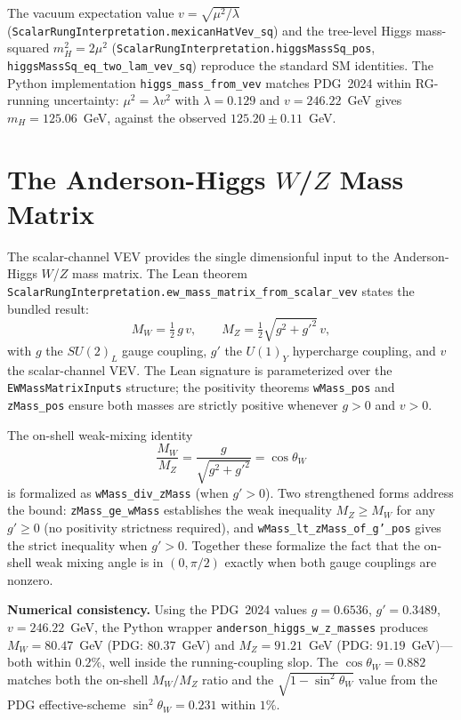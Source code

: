 \documentclass[aps,prd,twocolumn,showpacs,superscriptaddress,nofootinbib]{revtex4-2}
\begin{document}
The vacuum expectation value $v = \sqrt{\mu^2/\lambda}$
(\texttt{ScalarRungInterpretation.mexicanHatVev\_sq}) and the tree-level
Higgs mass-squared $m_H^2 = 2\mu^2$
(\texttt{ScalarRungInterpretation.higgsMassSq\_pos},
\texttt{higgsMassSq\_eq\_two\_lam\_vev\_sq}) reproduce the standard SM
identities. The Python implementation \texttt{higgs\_mass\_from\_vev}
matches PDG~2024 within RG-running uncertainty:
$\mu^2 = \lambda v^2$ with $\lambda = 0.129$ and $v = 246.22$~GeV gives
$m_H = 125.06$~GeV, against the observed $125.20 \pm 0.11$~GeV.

\section{The Anderson-Higgs $W$/$Z$ Mass Matrix}
\label{sec:ew-mass-matrix}

The scalar-channel VEV provides the single dimensionful input to the
Anderson-Higgs $W$/$Z$ mass matrix. The Lean theorem
\texttt{ScalarRungInterpretation.ew\_mass\_matrix\_from\_scalar\_vev}
states the bundled result:
\begin{equation}
M_W = \tfrac{1}{2}\,g\,v, \qquad
M_Z = \tfrac{1}{2}\sqrt{g^2 + g'^2}\,v,
\end{equation}
with $g$ the $SU(2)_L$ gauge coupling, $g'$ the $U(1)_Y$ hypercharge
coupling, and $v$ the scalar-channel VEV. The Lean signature is
parameterized over the \texttt{EWMassMatrixInputs} structure; the
positivity theorems \texttt{wMass\_pos} and \texttt{zMass\_pos} ensure
both masses are strictly positive whenever $g > 0$ and $v > 0$.

The on-shell weak-mixing identity
\begin{equation}
\label{eq:cos-theta-w}
\frac{M_W}{M_Z} = \frac{g}{\sqrt{g^2 + g'^2}} = \cos\theta_W
\end{equation}
is formalized as \texttt{wMass\_div\_zMass} (when $g'>0$). Two
strengthened forms address the bound:
\texttt{zMass\_ge\_wMass} establishes the weak inequality
$M_Z \geq M_W$ for any $g'\geq 0$ (no positivity strictness required),
and \texttt{wMass\_lt\_zMass\_of\_g'\_pos} gives the strict inequality
when $g' > 0$. Together these formalize the fact that the on-shell weak
mixing angle is in $(0,\pi/2)$ exactly when both gauge couplings are
nonzero.

\textbf{Numerical consistency.} Using the PDG~2024 values
$g = 0.6536$, $g' = 0.3489$, $v = 246.22$~GeV, the Python wrapper
\texttt{anderson\_higgs\_w\_z\_masses} produces
$M_W = 80.47$~GeV (PDG: $80.37$~GeV) and $M_Z = 91.21$~GeV
(PDG: $91.19$~GeV)---both within $0.2\%$, well inside the running-coupling
slop. The
$\cos\theta_W = 0.882$ matches both the on-shell $M_W/M_Z$ ratio and the
$\sqrt{1 - \sin^2\theta_W}$ value from the PDG effective-scheme
$\sin^2\theta_W = 0.231$ within $1\%$.
\end{document}
